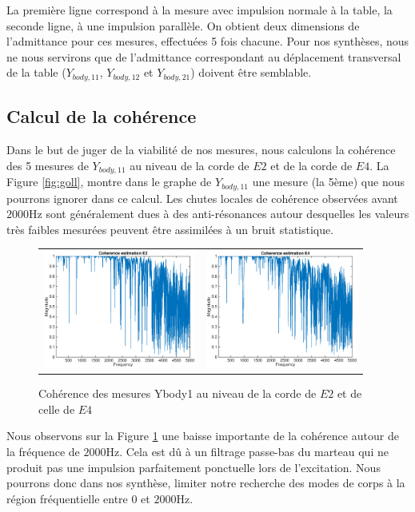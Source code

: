 La première ligne correspond à la mesure avec impulsion normale à la table, la seconde ligne, à une impulsion parallèle. On obtient deux dimensions de l'admittance pour ces mesures, effectuées 5 fois chacune. Pour nos synthèses, nous ne nous servirons que de l'admittance correspondant au déplacement transversal de la table ($Y_{body,11}$, $Y_{body,12}$ et $Y_{body,21}$) doivent être semblable.

\subsection{Calcul de la cohérence}
Dans le but de juger de la viabilité de nos mesures, nous calculons la cohérence des 5 mesures de $Y_{body,11}$ au niveau de la corde de \( E2 \) et de la corde de \( E4 \). La Figure \ref{fig:goll},  montre dans le graphe de $Y_{body,11}$ une mesure (la 5ème) que nous pourrons ignorer dans ce calcul. Les chutes locales de cohérence observées avant \( \si{2000\Hz} \) sont généralement dues à des anti-résonances autour desquelles les valeurs très faibles mesurées peuvent être assimilées à un bruit statistique.


\begin{figure}[hpbt]
\centering
\begin{tabular}{cc}
   \includegraphics[width = 5cm]{figures/coherence_Z_1_E2.eps} &
   \includegraphics[width = 5cm]{figures/coherence_Z_1_E4.eps} \\
\end{tabular}
\caption{Cohérence des mesures Ybody1 au niveau de la corde de \( E2 \) et de celle de \( E4 \)}
\label{fig:gall}
\end{figure}
Nous observons sur la Figure \ref{fig:gall} une baisse importante de la cohérence autour de la fréquence de \( \si{2000\Hz} \). Cela est dû à un filtrage passe-bas du marteau qui ne produit pas une impulsion parfaitement ponctuelle lors de l'excitation. Nous pourrons donc dans nos synthèse, limiter notre recherche des modes de corps à la région fréquentielle entre \( \si{0} \) et \( \si{2000\Hz} \).
